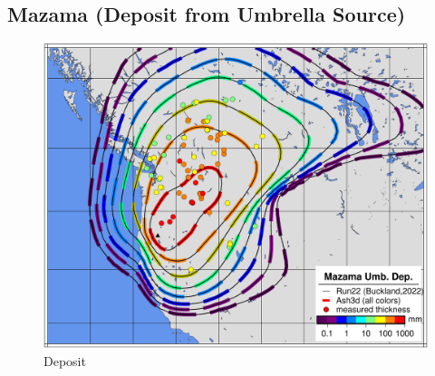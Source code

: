 \subsection{Mazama (Deposit from Umbrella Source)}
\begin{figure}[htbp]
\includegraphics[angle=0,scale=0.6]{Figures/TestCase_Results/ValidTest/Mazama_UmbrellaDeposit.pdf}
\parbox{15cm}{\caption{\label{FigTestValMazama} Deposit}}
\end{figure}

\clearpage
